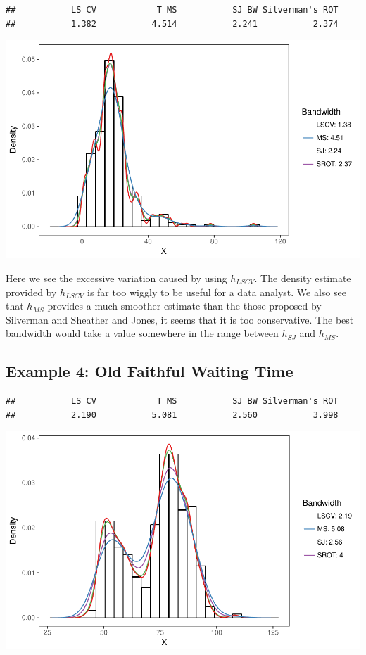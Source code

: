 \documentclass[]{article}
\begin{document}
\begin{verbatim}
##           LS CV            T MS           SJ BW Silverman's ROT 
##           1.382           4.514           2.241           2.374
\end{verbatim}

\begin{center}\includegraphics{FinalReport_files/figure-latex/unnamed-chunk-8-1} \end{center}

Here we see the excessive variation caused by using \(h_{LSCV}\). The
density estimate provided by \(h_{LSCV}\) is far too wiggly to be useful
for a data analyst. We also see that \(h_{MS}\) provides a much smoother
estimate than the those proposed by Silverman and Sheather and Jones, it
seems that it is too conservative. The best bandwidth would take a value
somewhere in the range between \(h_{SJ}\) and \(h_{MS}\).

\newpage

\subsection{Example 4: Old Faithful Waiting Time}

\begin{verbatim}
##           LS CV            T MS           SJ BW Silverman's ROT 
##           2.190           5.081           2.560           3.998
\end{verbatim}

\begin{center}\includegraphics{FinalReport_files/figure-latex/unnamed-chunk-9-1} \end{center}
\end{document}
